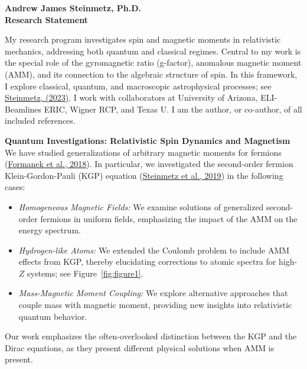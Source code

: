 \documentclass[11pt]{article}
\begin{document}
\begin{center}
    {\Large\textbf{Andrew James Steinmetz, Ph.D.}}\\[0.5em]
    {\large\textbf{Research Statement}}
\end{center}

\noindent
My research program investigates spin and magnetic moments in relativistic mechanics, addressing both quantum and classical regimes. Central to my work is the special role of the gyromagnetic ratio (g-factor), anomalous magnetic moment (AMM), and its connection to the algebraic structure of spin. In this framework, I explore classical, quantum, and macroscopic astrophysical processes; see \href{http://hdl.handle.net/10150/670301}{Steinmetz, (2023)}. I work with collaborators at University of Arizona, ELI-Beamlines ERIC, Wigner RCP, and Texas U. I am the author, or co-author, of all included references.

\vspace{1em}

{\noindent\Large\textbf{Quantum Investigations: Relativistic Spin Dynamics and Magnetism}}\\
We have studied generalizations of arbitrary magnetic moments for fermions (\href{https://doi.org/10.1088/1361-6587/aac06a}{Formanek et al., 2018}). In particular, we investigated the second-order fermion Klein-Gordon-Pauli (KGP) equation (\href{https://doi.org/10.1140/epja/i2019-12715-5}{Steinmetz et al., 2019}) in the following cases:
\begin{itemize}[leftmargin=1.5em,nosep]
    \item \emph{Homogeneous Magnetic Fields:} We examine solutions of generalized second-order fermions in uniform fields, emphasizing the impact of the AMM on the energy spectrum.
    \item \emph{Hydrogen-like Atoms:} We extended the Coulomb problem to include AMM effects from KGP, thereby elucidating corrections to atomic spectra for high-\(Z\) systems; see Figure~\ref{fig:figure1}.
    \item \emph{Mass-Magnetic Moment Coupling:} We explore alternative approaches that couple mass with magnetic moment, providing new insights into relativistic quantum behavior.
\end{itemize}
Our work emphasizes the often-overlooked distinction between the KGP and the Dirac equations, as they present different physical solutions when AMM is present.

\vspace{1em}
\end{document}

